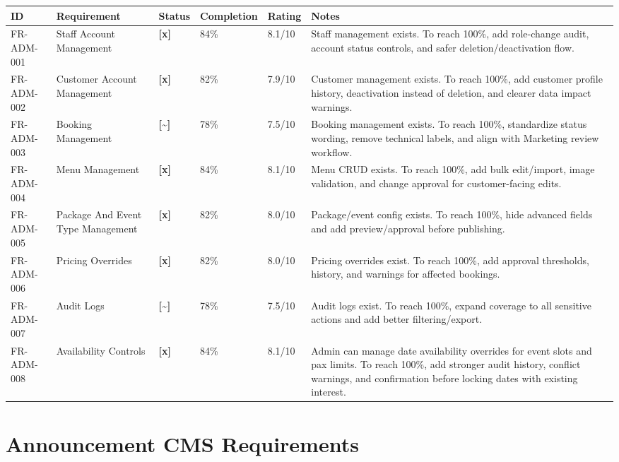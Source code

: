 \documentclass[11pt,a4paper]{article}
\newcommand{\statusdone}{\textbf{[x]}}
\newcommand{\statuspartial}{\textbf{[{\textasciitilde}]}}
\begin{document}
\begin{longtable}{L{0.15\textwidth} L{0.22\textwidth} C{0.08\textwidth} C{0.10\textwidth} C{0.10\textwidth} L{0.25\textwidth}}
\toprule
\textbf{ID} & \textbf{Requirement} & \textbf{Status} & \textbf{Completion} & \textbf{Rating} & \textbf{Notes} \\
\midrule
FR-ADM-001 & Staff Account Management & \statusdone & 84\% & 8.1/10 & Staff management exists. To reach 100\%, add role-change audit, account status controls, and safer deletion/deactivation flow. \\
FR-ADM-002 & Customer Account Management & \statusdone & 82\% & 7.9/10 & Customer management exists. To reach 100\%, add customer profile history, deactivation instead of deletion, and clearer data impact warnings. \\
FR-ADM-003 & Booking Management & \statuspartial & 78\% & 7.5/10 & Booking management exists. To reach 100\%, standardize status wording, remove technical labels, and align with Marketing review workflow. \\
FR-ADM-004 & Menu Management & \statusdone & 84\% & 8.1/10 & Menu CRUD exists. To reach 100\%, add bulk edit/import, image validation, and change approval for customer-facing edits. \\
FR-ADM-005 & Package And Event Type Management & \statusdone & 82\% & 8.0/10 & Package/event config exists. To reach 100\%, hide advanced fields and add preview/approval before publishing. \\
FR-ADM-006 & Pricing Overrides & \statusdone & 82\% & 8.0/10 & Pricing overrides exist. To reach 100\%, add approval thresholds, history, and warnings for affected bookings. \\
FR-ADM-007 & Audit Logs & \statuspartial & 78\% & 7.5/10 & Audit logs exist. To reach 100\%, expand coverage to all sensitive actions and add better filtering/export. \\
FR-ADM-008 & Availability Controls & \statusdone & 84\% & 8.1/10 & Admin can manage date availability overrides for event slots and pax limits. To reach 100\%, add stronger audit history, conflict warnings, and confirmation before locking dates with existing interest. \\
\bottomrule
\end{longtable}

\section{Announcement CMS Requirements}
\end{document}
